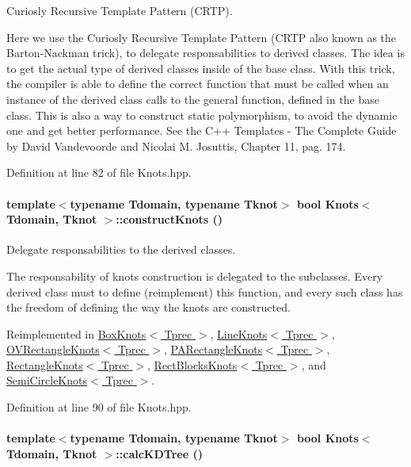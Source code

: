 Curiosly Recursive Template Pattern (CRTP). 

Here we use the Curiosly Recursive Template Pattern (CRTP also known as the Barton-Nackman trick), to delegate responsabilities to derived classes. The idea is to get the actual type of derived classes inside of the base class. With this trick, the compiler is able to define the correct function that must be called when an instance of the derived class calls to the general function, defined in the base class. This is also a way to construct static polymorphism, to avoid the dynamic one and get better performance. See the C++ Templates - The Complete Guide by David Vandevoorde and Nicolai M. Josuttis, Chapter 11, pag. 174. 

Definition at line 82 of file Knots.hpp.\hypertarget{classKnots_8e622932aee837d4c3465093f3158ebb}{
\paragraph[{constructKnots}]{\setlength{\rightskip}{0pt plus 5cm}template$<$typename Tdomain, typename Tknot$>$ bool {\bf Knots}$<$ Tdomain, Tknot $>$::constructKnots ()}\hfill}
\label{classKnots_8e622932aee837d4c3465093f3158ebb}


Delegate responsabilities to the derived classes. 

The responsability of knots construction is delegated to the subclasses. Every derived class must to define (reimplement) this function, and every such class has the freedom of defining the way the knots are constructed. 

Reimplemented in \hyperlink{classBoxKnots_fe5f5142f80f351546584e3a0ad8e7eb}{BoxKnots$<$ Tprec $>$}, \hyperlink{classLineKnots_de473737fc4dabcb3c4ce0bb56394e25}{LineKnots$<$ Tprec $>$}, \hyperlink{classOVRectangleKnots_57cd6386ac15fafdbcd2475c44f4397a}{OVRectangleKnots$<$ Tprec $>$}, \hyperlink{classPARectangleKnots_3e8981078e760ca21870882bb3192846}{PARectangleKnots$<$ Tprec $>$}, \hyperlink{classRectangleKnots_b9906bc5081f67e7f0ce6da2123028bf}{RectangleKnots$<$ Tprec $>$}, \hyperlink{classRectBlocksKnots_cd9a8af5b8a5a241d149ff0b1efb4318}{RectBlocksKnots$<$ Tprec $>$}, and \hyperlink{classSemiCircleKnots_af1e7ded0e5a9ed35d61a1ae63621b6d}{SemiCircleKnots$<$ Tprec $>$}.

Definition at line 90 of file Knots.hpp.\hypertarget{classKnots_bfdff0840a5878ae0dd0f317c81a4630}{
\paragraph[{calcKDTree}]{\setlength{\rightskip}{0pt plus 5cm}template$<$typename Tdomain, typename Tknot$>$ bool {\bf Knots}$<$ Tdomain, Tknot $>$::calcKDTree ()}\hfill}
\label{classKnots_bfdff0840a5878ae0dd0f317c81a4630}


